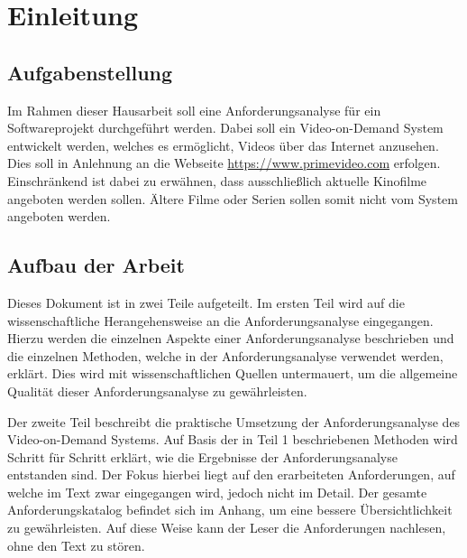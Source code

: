 \section{Einleitung}
\subsection{Aufgabenstellung}
Im Rahmen dieser Hausarbeit soll eine Anforderungsanalyse für ein Softwareprojekt durchgeführt werden.
Dabei soll ein Video-on-Demand System entwickelt werden, welches es ermöglicht, Videos über das Internet anzusehen.
Dies soll in Anlehnung an die Webseite \url{https://www.primevideo.com} erfolgen.
Einschränkend ist dabei zu erwähnen, dass ausschließlich aktuelle Kinofilme angeboten werden sollen.
Ältere Filme oder Serien sollen somit nicht vom System angeboten werden.

\subsection{Aufbau der Arbeit}
Dieses Dokument ist in zwei Teile aufgeteilt.
Im ersten Teil wird auf die wissenschaftliche Herangehensweise an die Anforderungsanalyse eingegangen.
Hierzu werden die einzelnen Aspekte einer Anforderungsanalyse beschrieben und die einzelnen Methoden, welche in der Anforderungsanalyse verwendet werden, erklärt.
Dies wird mit wissenschaftlichen Quellen untermauert, um die allgemeine Qualität dieser Anforderungsanalyse zu gewährleisten.

Der zweite Teil beschreibt die praktische Umsetzung der Anforderungsanalyse des Video-on-Demand Systems.
Auf Basis der in Teil 1 beschriebenen Methoden wird Schritt für Schritt erklärt, wie die Ergebnisse der Anforderungsanalyse entstanden sind.
Der Fokus hierbei liegt auf den erarbeiteten Anforderungen, auf welche im Text zwar eingegangen wird, jedoch nicht im Detail.
Der gesamte Anforderungskatalog befindet sich im Anhang, um eine bessere Übersichtlichkeit zu gewährleisten.
Auf diese Weise kann der Leser die Anforderungen nachlesen, ohne den Text zu stören.
